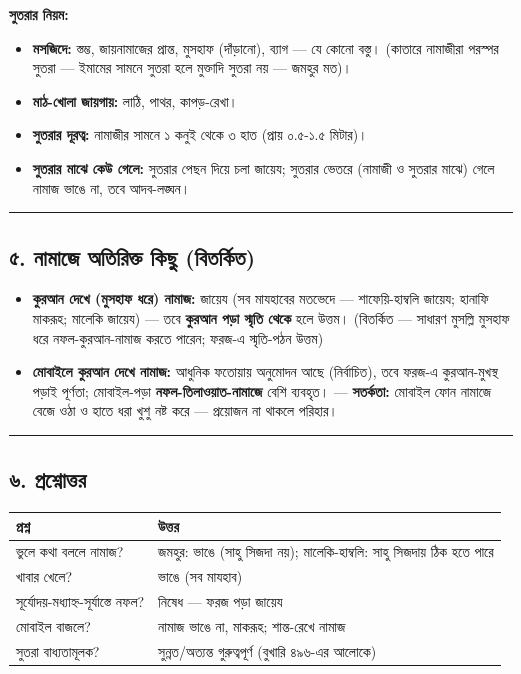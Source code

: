 \textbf{সুতরার নিয়ম:}
\begin{itemize}
\item \textbf{মসজিদে:} স্তম্ভ, জায়নামাজের প্রান্ত, মুসহাফ (দাঁড়ানো), ব্যাগ — যে কোনো বস্তু। (কাতারে নামাজীরা পরস্পর সুতরা — ইমামের সামনে সুতরা হলে মুক্তাদি সুতরা নয় — জমহুর মত)।
\item \textbf{মাঠ-খোলা জায়গায়:} লাঠি, পাথর, কাপড়-রেখা।
\item \textbf{সুতরার দূরত্ব:} নামাজীর সামনে ১ কনুই থেকে ৩ হাত (প্রায় ০.৫-১.৫ মিটার)।
\item \textbf{সুতরার মাঝে কেউ গেলে:} সুতরার পেছন দিয়ে চলা জায়েয; সুতরার ভেতরে (নামাজী ও সুতরার মাঝে) গেলে নামাজ ভাঙে না, তবে আদব-লঙ্ঘন।
\end{itemize}
\medskip\hrule\medskip

\subsection*{৫. নামাজে অতিরিক্ত কিছু (বিতর্কিত)}

\begin{itemize}
\item \textbf{কুরআন দেখে (মুসহাফ ধরে) নামাজ:} জায়েয (সব মাযহাবের মতভেদে — শাফেয়ি-হাম্বলি জায়েয; হানাফি মাকরূহ; মালেকি জায়েয) — তবে \textbf{কুরআন পড়া স্মৃতি থেকে} হলে উত্তম। (বিতর্কিত — সাধারণ মুসল্লি মুসহাফ ধরে নফল-কুরআন-নামাজ করতে পারেন; ফরজ-এ স্মৃতি-পঠন উত্তম)
\item \textbf{মোবাইলে কুরআন দেখে নামাজ:} আধুনিক ফতোয়ায় অনুমোদন আছে (নির্বাচিত), তবে ফরজ-এ কুরআন-মুখস্থ পড়াই পূর্ণতা; মোবাইল-পড়া \textbf{নফল-তিলাওয়াত-নামাজে} বেশি ব্যবহৃত। — \textbf{সতর্কতা:} মোবাইল ফোন নামাজে বেজে ওঠা ও হাতে ধরা খুশু নষ্ট করে — প্রয়োজন না থাকলে পরিহার।
\end{itemize}
\medskip\hrule\medskip

\subsection*{৬. প্রশ্নোত্তর}

\begin{table}[h]\centering\small
\begin{tabular}{ll}
প্রশ্ন & উত্তর \\
\hline
ভুলে কথা বললে নামাজ? & জমহুর: ভাঙে (সাহু সিজদা নয়); মালেকি-হাম্বলি: সাহু সিজদায় ঠিক হতে পারে \\
খাবার খেলে? & ভাঙে (সব মাযহাব) \\
সূর্যোদয়-মধ্যাহ্ন-সূর্যাস্তে নফল? & নিষেধ — ফরজ পড়া জায়েয \\
মোবাইল বাজলে? & নামাজ ভাঙে না, মাকরূহ; শান্ত-রেখে নামাজ \\
সুতরা বাধ্যতামূলক? & সুন্নত/অত্যন্ত গুরুত্বপূর্ণ (বুখারি ৪৯৬-এর আলোকে) \\
\hline
\end{tabular}
\end{table}

